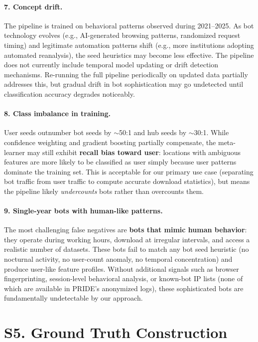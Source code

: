 \documentclass[11pt,a4paper]{article}
\begin{document}
\paragraph{7. Concept drift.} The pipeline is trained on behavioral patterns observed during 2021--2025. As bot technology evolves (e.g., AI-generated browsing patterns, randomized request timing) and legitimate automation patterns shift (e.g., more institutions adopting automated reanalysis), the seed heuristics may become less effective. The pipeline does not currently include temporal model updating or drift detection mechanisms. Re-running the full pipeline periodically on updated data partially addresses this, but gradual drift in bot sophistication may go undetected until classification accuracy degrades noticeably.

\paragraph{8. Class imbalance in training.} User seeds outnumber bot seeds by $\sim$50:1 and hub seeds by $\sim$30:1. While confidence weighting and gradient boosting partially compensate, the meta-learner may still exhibit \textbf{recall bias toward user}: locations with ambiguous features are more likely to be classified as user simply because user patterns dominate the training set. This is acceptable for our primary use case (separating bot traffic from user traffic to compute accurate download statistics), but means the pipeline likely \emph{undercounts} bots rather than overcounts them.

\paragraph{9. Single-year bots with human-like patterns.} The most challenging false negatives are \textbf{bots that mimic human behavior}: they operate during working hours, download at irregular intervals, and access a realistic number of datasets. These bots fail to match any bot seed heuristic (no nocturnal activity, no user-count anomaly, no temporal concentration) and produce user-like feature profiles. Without additional signals such as browser fingerprinting, session-level behavioral analysis, or known-bot IP lists (none of which are available in PRIDE's anonymized logs), these sophisticated bots are fundamentally undetectable by our approach.


\section{S5. Ground Truth Construction}
\label{sec:ground_truth}
\end{document}
